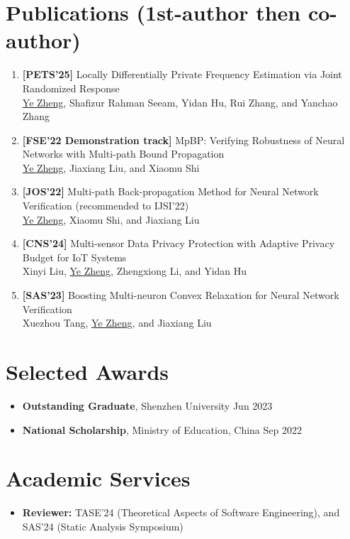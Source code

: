 \documentclass[a4paper,11pt]{article}
\begin{document}
\section{\textbf{Publications} \textnormal{\scriptsize (1st-author then co-author)}}

\begin{enumerate}[leftmargin=*,labelsep=2mm]
  \item \textbf{[PETS'25]} Locally Differentially Private Frequency Estimation via Joint Randomized Response \\
  \uline{Ye Zheng}, Shafizur Rahman Seeam, Yidan Hu, Rui Zhang, and Yanchao Zhang
  \item \textbf{[FSE'22 Demonstration track]} MpBP: Verifying Robustness of Neural Networks with Multi-path Bound Propagation \\
  \uline{Ye Zheng}, Jiaxiang Liu, and Xiaomu Shi
  \item \textbf{[JOS'22]} Multi-path Back-propagation Method for Neural Network Verification (recommended to IJSI'22)\\
  \uline{Ye Zheng}, Xiaomu Shi, and Jiaxiang Liu
  \item \textbf{[CNS'24]} Multi-sensor Data Privacy Protection with Adaptive Privacy Budget for IoT Systems \\
  Xinyi Liu, \uline{Ye Zheng}, Zhengxiong Li, and Yidan Hu
  \item \textbf{[SAS'23]} Boosting Multi-neuron Convex Relaxation for Neural Network Verification \\
  Xuezhou Tang, \uline{Ye Zheng}, and Jiaxiang Liu
\end{enumerate}


\section{\textbf{Selected Awards}}

\begin{itemize}[leftmargin=0pt,label={}]
  \item \textbf{Outstanding Graduate}, Shenzhen University \hfill Jun 2023\vspace{-0.5em}
  \item \textbf{National Scholarship}, Ministry of Education, China \hfill Sep 2022
\end{itemize}


\section{\textbf{Academic Services}}

\begin{itemize}[leftmargin=0pt,label={}]
  \item \textbf{Reviewer:} TASE'24 (Theoretical Aspects of Software Engineering), and SAS'24 (Static Analysis Symposium)
\end{itemize}
\end{document}
